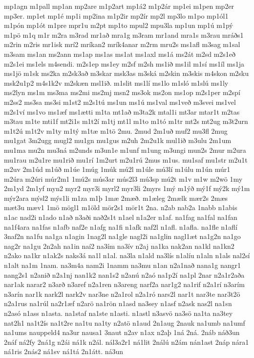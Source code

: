 {mp1agn
m1pall
mp1an
mp2are
m1p2art
mp1á2
m1p2ár
mp1ei
m1pen
mp2er
mp3er.
mp1et
mp1é
mp1i
mp2ina
m1p2ir
mp2ír
mp2l
mp3lo
m1po
mp1ól1
m1pón
mp1ót
m1pre
mpr1u
m2pt
mp1to
mpul2
mpu3la
mp1un
mp1ú
m1pý
m1pö
m1q
m1r
m2ra
m3rad
mr1að
mra1g
m3ram
mr1and
mra1s
m3rau
mráðs1
m2rin
m2ris
mr1isk
mrí2
mríkan2
mrík4anar
m2rm
mru2s
ms1afl
m3sag
m1sal
m3sam
ms1an
ms2ann
ms1ap
ms1as
ms1at
ms1axl
ms1á
ms2át
m2sd
m2s1eð
m2s1ei
ms1els
m4sendi.
m2s1ep
ms1ey
m2sf
m2sh
ms1ið
ms1il
m1sí
ms1íl
ms1ja
ms1jö
m1sk
ms2ka
m2sk3að
m3skar
msk3as
m3ská
m2skin
m3skis
m4skon
m2sku
msk2u1p2
m4s1k2v
m2skæn
msl1ið.
m1slit
ms1lí
ms1lo
m1sló
m1slú
ms1ly
ms2lyn
ms1m
ms3ma
ms2mi
ms2mj
msn2
ms3ok
ms2on
ms1op
m2s1per
m2spí
m2ss2
ms3sa
ms3si
m1st2
m2s1tú
ms1un
ms1ú
ms1val
ms1veð
m3svei
ms1vel
m2s1ví
ms1vo
ms1æf
ms1ætti
m1ta
mt1að
m3ta2k
mtal1i
mt3ar
mtar1t
m2tas
m3tau
m1te
mti1f
mt2i1s
m1t2í
m1tj
mt1l
m1to
m1tó
m1tr
mt2s
mt2ug
m3t2urn
m1t2ú
m1t2v
m1ty
m1tý
m1tæ
m1tö
2mu.
2mud
2m1uð
muf2
mu3fl
2mug
mu1gat
3m2ugg
mugl2
mu1gn
mu1gus
m2uh
2m2u1k
mul1ið
m3ulu
2m1um
mu1ma
mu2n
mu3ná
m2unds
m3un1e
m1unf
m1ung
m3ungi
mun2s
2mur
m2ura
mu1rau
m2u1re
mu1rið
mu1rí
1m2urt
m2u1rú
2mus
m1us.
mu1saf
mu1str
m2u1t
m2uv
2m1úd
m1úð
m1úe
1múg
1múk
mú2l
m1úle
mú3lí
m1úlu
m1ún
múr1
m2úra
m2úri
múr2m1
1mú2s
mús3ar
mús2l3
mú3sp
mú2t
m1v
m1w
m2wö
1my
2m1yd
2m1yf
myn2
myr2
myr3i
myrl2
myr3li
2myrs
1mý
m1ýð
mý1f
mý2k
mý1m
mýr2ara
mýsl2
mýs1li
m1za
m1þ
1mæ
2mæð.
m1æleg
2mælk
mær2s
2mæs
mæt3u
mæv1
1mö
mögl1
m1öld
mör2s1
mör1t
2na.
n2ab
nab2a
1nabb
n1abis
n1ac
nad2i
n1ado
n1að
n3aði
nað2s1t
n1ael
n1a2er
n1af.
na1fag
na1fal
na1fan
na1f4ara
na1fas
n1afb
naf2e
n1afg
na1fi
n1afk
naf2l
n1afl.
n1afla.
na1fle
n1aflí
3naf2n
na1fu
na1ga
n1agin
1nag2l
na1gle
nagl2i
na1glin
nagl1æt
na1g2n
na1go
nag2r
na1gu
2n2ah
na1in
naí2
na3ím
na3ív
n2aj
na1ka
nak2an
na1kl
na1kn2
n2ako
na1kr
n1ak2s
naks3á
na1l
n1al.
na3la
n1ald
na3lís
n1alíu
n1aln
n1als
nal2sí
n1alt
na1m
1nam.
na3m4a
nam2i
1namm
na3mu
n1an
n2a1nað
nana1g
nangr1
nang2s1
n2anið
n2a1nj
nan1k2
nan1s2
n2anú
n2aó
na1p2í
na1pl
2nar
n2a1r2aða
nar1ak
narar2
n3arð
n3aref
n2a1ren
n3areng
narf2a
nar1g2
na1rif
n2a1rí
n3arím
n3arín
nar1k
nark2l
nark2v
nar3ne
n2a1rol
n2a1ró
nars2l
nar1t
nar3te
nar3t2ö
n2a1rus
na1rúl
na2r1æf
n2arö
na1rön
n1asd
na3sey
n1asf
n2ask
nas2l
na1sn
n2asó
n1ass
n1asta.
na1staf
na1ste
n1asti.
n1astl
n3asvö
na3sö
na1ta
na3tey
nat2h1
na1t2ís
na1t2re
na1tu
na1ty
n2atö
n1aud
2n1aug
2nauk
na1umb
na1umf
na1ums
nauppeld4
na3ur
nausa1
3naut
n2av
n1ax
n2aþ
1ná
2ná.
2náb
náð3un
2náf
ná2fy
2ná1g
n2ái
ná1k
n2ál.
nál3a2r1
ná1lit
2nálú
n2ám
nán1ast
2náp
nára1
ná1ris
2nás2
ná1sv
ná1tá
2n1átt.
ná3un
}

